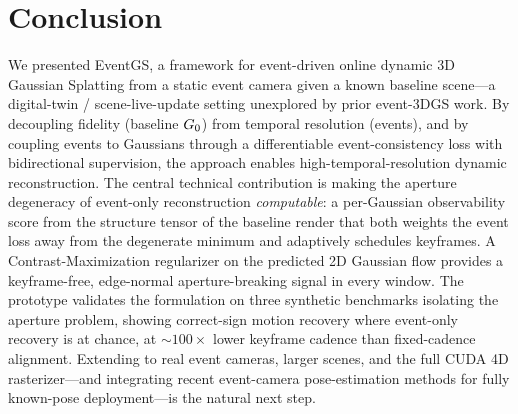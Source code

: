 \section{Conclusion}
\label{sec:conclusion}
We presented EventGS, a framework for event-driven online dynamic 3D Gaussian Splatting from a static event camera given a known baseline scene---a digital-twin / scene-live-update setting unexplored by prior event-3DGS work. By decoupling fidelity (baseline $G_0$) from temporal resolution (events), and by coupling events to Gaussians through a differentiable event-consistency loss with bidirectional supervision, the approach enables high-temporal-resolution dynamic reconstruction. The central technical contribution is making the aperture degeneracy of event-only reconstruction \emph{computable}: a per-Gaussian observability score from the structure tensor of the baseline render that both weights the event loss away from the degenerate minimum and adaptively schedules keyframes. A Contrast-Maximization regularizer on the predicted 2D Gaussian flow provides a keyframe-free, edge-normal aperture-breaking signal in every window. The prototype validates the formulation on three synthetic benchmarks isolating the aperture problem, showing correct-sign motion recovery where event-only recovery is at chance, at $\sim$$100\times$ lower keyframe cadence than fixed-cadence alignment. Extending to real event cameras, larger scenes, and the full CUDA 4D rasterizer---and integrating recent event-camera pose-estimation methods for fully known-pose deployment---is the natural next step.
